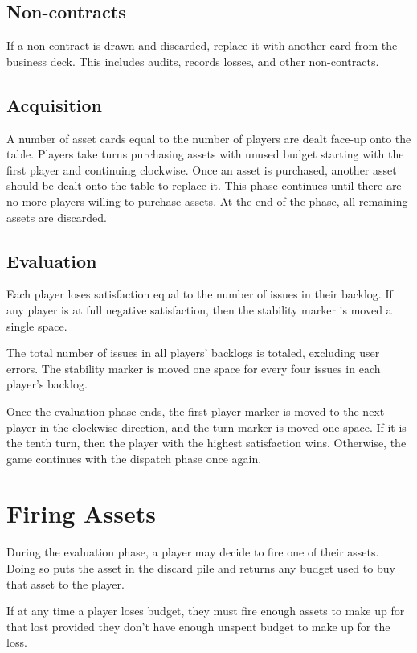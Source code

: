 \documentclass[twocolumn]{article}
\begin{document}
\subsection*{Non-contracts}

If a non-contract is drawn and discarded, replace it with another card from the business deck. This includes audits, records losses, and other non-contracts.

\subsection*{Acquisition}

A number of asset cards equal to the number of players are dealt face-up onto the table. Players take turns purchasing assets with unused budget starting with the first player and continuing clockwise. Once an asset is purchased, another asset should be dealt onto the table to replace it. This phase continues until there are no more players willing to purchase assets. At the end of the phase, all remaining assets are discarded.

\subsection*{Evaluation}

Each player loses satisfaction equal to the number of issues in their backlog. If any player is at full negative satisfaction, then the stability marker is moved a single space.

The total number of issues in all players' backlogs is totaled, excluding user errors. The stability marker is moved one space for every four issues in each player's backlog.

Once the evaluation phase ends, the first player marker is moved to the next player in the clockwise direction, and the turn marker is moved one space. If it is the tenth turn, then the player with the highest satisfaction wins. Otherwise, the game continues with the dispatch phase once again.

\section*{Firing Assets}

During the evaluation phase, a player may decide to fire one of their assets. Doing so puts the asset in the discard pile and returns any budget used to buy that asset to the player.

If at any time a player loses budget, they must fire enough assets to make up for that lost provided they don't have enough unspent budget to make up for the loss.
\end{document}
